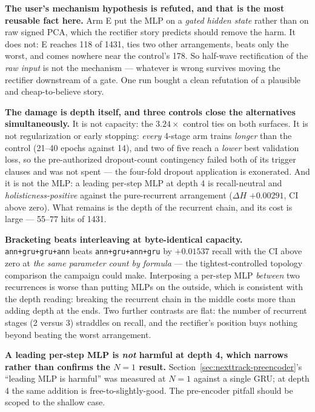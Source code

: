 \documentclass[11pt]{article}
\begin{document}
\textbf{The user's mechanism hypothesis is refuted, and that is the most reusable
fact here.} Arm E put the MLP on a \emph{gated hidden state} rather than on raw
signed PCA, which the rectifier story predicts should remove the harm. It does not:
E reaches \num{118} of \num{1431}, ties two other arrangements, beats only the
worst, and comes nowhere near the control's \num{178}. So half-wave rectification
of the \emph{raw input} is not the mechanism --- whatever is wrong survives moving
the rectifier downstream of a gate. One run bought a clean refutation of a
plausible and cheap-to-believe story.

\textbf{The damage is depth itself, and three controls close the alternatives
simultaneously.} It is not capacity: the $\num{3.24}\times$ control ties on both
surfaces. It is not regularization or early stopping: \emph{every} 4-stage arm
trains \emph{longer} than the control (\numrange{21}{40} epochs against \num{14}),
and two of five reach a \emph{lower} best validation loss, so the pre-authorized
dropout-count contingency failed both of its trigger clauses and was not spent ---
the four-fold dropout application is exonerated. And it is not the MLP: a leading
per-step MLP at depth 4 is recall-neutral and \emph{holisticness-positive} against
the pure-recurrent arrangement ($\Delta H$ $+\num{0.00291}$, CI above zero). What
remains is the depth of the recurrent chain, and its cost is large ---
\numrange{55}{77} hits of \num{1431}.

\textbf{Bracketing beats interleaving at byte-identical capacity.}
\texttt{ann+gru+gru+ann} beats \texttt{ann+gru+ann+gru} by $+\num{0.01537}$ recall
with the CI above zero at \emph{the same parameter count by formula} --- the
tightest-controlled topology comparison the campaign could make. Interposing a
per-step MLP \emph{between} two recurrences is worse than putting MLPs on the
outside, which is consistent with the depth reading: breaking the recurrent chain
in the middle costs more than adding depth at the ends. Two further contrasts are
flat: the number of recurrent stages (2 versus 3) straddles on recall, and the
rectifier's position buys nothing beyond beating the worst arrangement.

\textbf{A leading per-step MLP is \emph{not} harmful at depth 4, which narrows
rather than confirms the $N=1$ result.} Section~\ref{sec:nexttrack-preencoder}'s ``leading
MLP is harmful'' was measured at $N=1$ against a single GRU; at depth 4 the same
addition is free-to-slightly-good. The pre-encoder pitfall should be scoped to the
shallow case.
\end{document}

